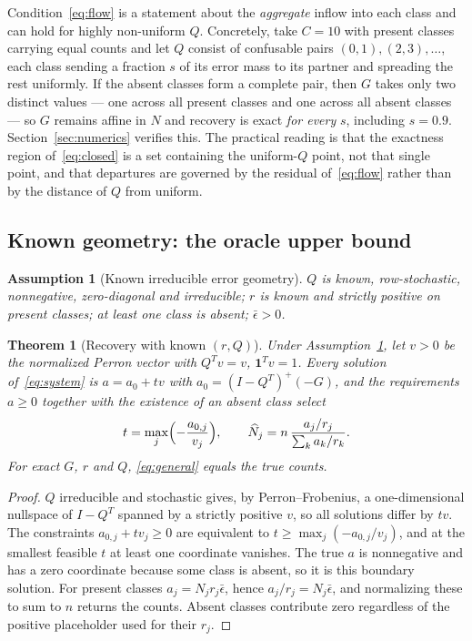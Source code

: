 \documentclass[11pt]{article}
\newtheorem{assumption}{Assumption}
\newtheorem{theorem}{Theorem}
\theoremstyle{remark}
\newcommand{\one}{\mathbf{1}}
\begin{document}
Condition~\eqref{eq:flow} is a statement about the \emph{aggregate} inflow
into each class and can hold for highly non-uniform $Q$. Concretely, take
$C=10$ with present classes carrying equal counts and let $Q$ consist of
confusable pairs $(0,1), (2,3), \ldots$, each class sending a fraction $s$ of
its error mass to its partner and spreading the rest uniformly. If the absent
classes form a complete pair, then $G$ takes only two distinct values --- one
across all present classes and one across all absent classes --- so $G$
remains affine in $N$ and recovery is exact \emph{for every} $s$, including
$s = 0.9$. Section~\ref{sec:numerics} verifies this. The practical reading is
that the exactness region of~\eqref{eq:closed} is a set containing the
uniform-$Q$ point, not that single point, and that departures are governed by
the residual of~\eqref{eq:flow} rather than by the distance of $Q$ from
uniform.

\subsection{Known geometry: the oracle upper bound}

\begin{assumption}[Known irreducible error geometry]
\label{ass:geom}
$Q$ is known, row-stochastic, nonnegative, zero-diagonal and irreducible;
$r$ is known and strictly positive on present classes; at least one class is
absent; $\bar\epsilon>0$.
\end{assumption}

\begin{theorem}[Recovery with known $(r,Q)$]
\label{thm:general}
Under Assumption~\ref{ass:geom}, let $v>0$ be the normalized Perron vector
with $Q^Tv=v$, $\one^Tv=1$. Every solution of~\eqref{eq:system} is
$a = a_0 + tv$ with $a_0 = (I-Q^T)^{+}(-G)$, and the requirements $a \ge 0$
together with the existence of an absent class select
\begin{equation}
 t = \max_j\Bigl(-\frac{a_{0,j}}{v_j}\Bigr),
 \qquad
 \widehat N_j = n\,\frac{a_j/r_j}{\sum_k a_k/r_k}.
 \label{eq:general}
\end{equation}
For exact $G$, $r$ and $Q$, \eqref{eq:general} equals the true counts.
\end{theorem}

\begin{proof}
$Q$ irreducible and stochastic gives, by Perron--Frobenius, a
one-dimensional nullspace of $I-Q^T$ spanned by a strictly positive $v$, so
all solutions differ by $tv$. The constraints $a_{0,j}+tv_j\ge0$ are
equivalent to $t \ge \max_j(-a_{0,j}/v_j)$, and at the smallest feasible $t$
at least one coordinate vanishes. The true $a$ is nonnegative and has a zero
coordinate because some class is absent, so it is this boundary solution. For
present classes $a_j = N_jr_j\bar\epsilon$, hence
$a_j/r_j = N_j\bar\epsilon$, and normalizing these to sum to $n$ returns the
counts. Absent classes contribute zero regardless of the positive placeholder
used for their $r_j$.
\end{proof}
\end{document}
